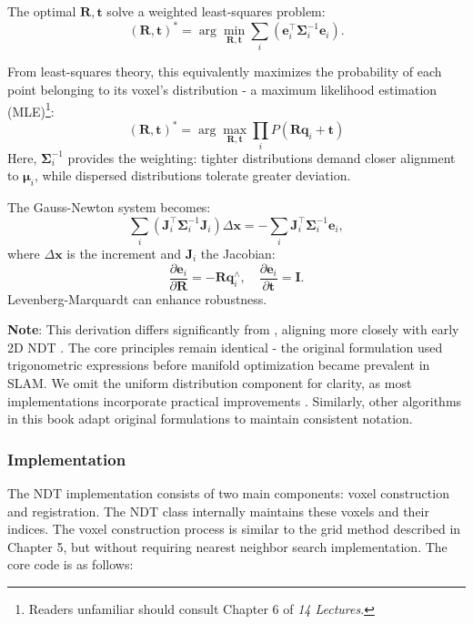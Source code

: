The optimal $\bm{R}, \bm{t}$ solve a weighted least-squares problem:
\begin{equation}\label{key}
	(\bm{R},\bm{t})^* = \arg \min\limits_{\bm{R}, \bm{t}} \sum_{i} (\bm{e}_i^\top \boldsymbol{\Sigma}_i^{-1} \bm{e}_i) .
\end{equation}

From least-squares theory, this equivalently maximizes the probability of each point belonging to its voxel's distribution - a maximum likelihood estimation (MLE)\footnote{Readers unfamiliar should consult Chapter 6 of \textit{14 Lectures}.}:
\begin{equation}\label{key}
	(\bm{R},\bm{t})^* = \arg \max\limits_{\bm{R}, \bm{t}} \prod_{i} P(\bm{R} \bm{q}_i + \bm{t})
\end{equation}
Here, $\boldsymbol{\Sigma}^{-1}_i$ provides the weighting: tighter distributions demand closer alignment to $\boldsymbol{\mu}_i$, while dispersed distributions tolerate greater deviation.

The Gauss-Newton system becomes:
\begin{equation}\label{eq:ndt-normal-equation}
	\sum_{i} (\bm{J}_i^\top \boldsymbol{\Sigma}_i^{-1} \bm{J}_i) \Delta \bm{x} = -\sum_{i} \bm{J}_i^\top \boldsymbol{\Sigma}^{-1}_i \bm{e}_i,
\end{equation}
where $\Delta \bm{x}$ is the increment and $\bm{J}_i$ the Jacobian:
\begin{equation}\label{key}
	\frac{\partial \bm{e}_i}{\partial \bm{R}} = -\bm{R} \bm{q}_i^\wedge, \quad \frac{\partial \bm{e}_i}{\partial \bm{t}} = \bm{I}.
\end{equation}
Levenberg-Marquardt can enhance robustness.

\textbf{Note}: This derivation differs significantly from \cite{Magnusson2009}, aligning more closely with early 2D NDT \cite{Biber2003}. The core principles remain identical - the original formulation used trigonometric expressions before manifold optimization became prevalent in SLAM. We omit the uniform distribution component for clarity, as most implementations incorporate practical improvements \cite{Kung2021, Rapp2015}. Similarly, other algorithms in this book adapt original formulations to maintain consistent notation.

\subsubsection{Implementation}
The NDT implementation consists of two main components: voxel construction and registration. The NDT class internally maintains these voxels and their indices. The voxel construction process is similar to the grid method described in Chapter 5, but without requiring nearest neighbor search implementation. The core code is as follows:

